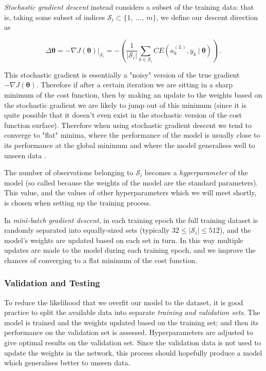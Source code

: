 \documentclass{article}[11pt]
\begin{document}
            \textit{Stochastic gradient descent} instead considers a subset of the training data: that is, taking some subset of indices $\mathcal{S}_i \subset \{1, \ \ldots, \ m\}$, we define our descent direction as
            
            $$
            \Delta \boldsymbol{\theta} = - \nabla J(\boldsymbol{\theta}) \big\vert_{\mathcal{S}_i} = - \left( \frac{1}{\lvert \mathcal{S}_i \rvert} \sum_{k \in \mathcal{S}_i} CE(a^{(L)}_k, y_k \ \vert \ \boldsymbol{\theta}) \right) \,.
            $$
            
            This stochastic gradient is essentially a "noisy" version of the true gradient $- \nabla J(\boldsymbol{\theta})$. Therefore if after a certain iteration we are sitting in a sharp minimum of the cost function, then by making an update to the weights based on the stochastic gradient we are likely to jump out of this minimum (since it is quite possible that it doesn't even exist in the stochastic version of the cost function surface). Therefore when using stochastic gradient descent we tend to converge to "flat" minima, where the performance of the model is usually close to its performance at the global minimum and where the model generalises well to unseen data \cite{loss_surfaces}.
            
            The number of observations belonging to $\mathcal{S}_i$ becomes a \textit{hyperparameter} of the model (so called because the weights of the model are the standard parameters). This value, and the values of other hyperparameters which we will meet shortly, is chosen when setting up the training process.
            
            In \textit{mini-batch gradient descent}, in each training epoch the full training dataset is randomly separated into equally-sized sets (typically $32 \leq \lvert \mathcal{S}_i \rvert \leq 512$), and the model's weights are updated based on each set in turn. In this way multiple updates are made to the model during each training epoch, and we improve the chances of converging to a flat minimum of the cost function.
            
            
        
        \subsubsection{Validation and Testing}
        
            To reduce the likelihood that we overfit our model to the dataset, it is good practice to split the available data into separate \textit{training and validation sets}. The model is trained and the weights updated based on the training set; and then its performance on the validation set is assessed. Hyperparameters are adjusted to give optimal results on the validation set. Since the validation data is not used to update the weights in the network, this process should hopefully produce a model which generalises better to unseen data.
            
\end{document}
